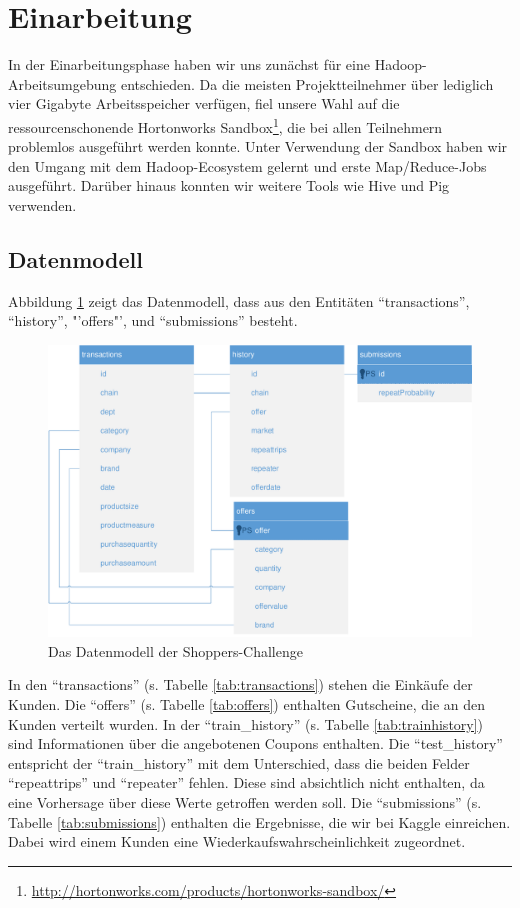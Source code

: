 \section{Einarbeitung}
In der Einarbeitungsphase haben wir uns zunächst für eine Hadoop-Arbeitsumgebung entschieden. Da die meisten Projektteilnehmer über lediglich vier Gigabyte Arbeitsspeicher verfügen, fiel unsere Wahl auf die ressourcenschonende Hortonworks Sandbox\footnote{\url{http://hortonworks.com/products/hortonworks-sandbox/}}, die bei allen Teilnehmern problemlos ausgeführt werden konnte. Unter Verwendung der Sandbox haben wir den Umgang mit dem Hadoop-Ecosystem gelernt und erste Map/Reduce-Jobs ausgeführt. Darüber hinaus konnten wir weitere Tools wie Hive und Pig verwenden.

\renewcommand{\arraystretch}{1.3}

\subsection{Datenmodell}
Abbildung \ref{fig:ShoppersTables} zeigt das Datenmodell, dass aus den Entitäten "`transactions"', "`history"', "'offers"', und "`submissions"' besteht. 

\begin{figure}[H]
\centering
\includegraphics[width=0.93\linewidth]{Bilder/ShoppersTables}
\caption{Das Datenmodell der Shoppers-Challenge}
\label{fig:ShoppersTables}
\end{figure}

In den "`transactions"' (s. Tabelle \ref{tab:transactions}) stehen die Einkäufe der Kunden.
Die "`offers"' (s. Tabelle \ref{tab:offers}) enthalten Gutscheine, die an den Kunden verteilt wurden.
In der "`train\_history"' (s. Tabelle \ref{tab:trainhistory}) sind Informationen über die angebotenen Coupons enthalten.
Die "`test\_history"' entspricht der "`train\_history"' mit dem Unterschied, dass die beiden Felder "`repeattrips"' und "`repeater"' fehlen. Diese sind absichtlich nicht enthalten, da eine Vorhersage über diese Werte getroffen werden soll.
Die "`submissions"' (s. Tabelle \ref{tab:submissions}) enthalten die Ergebnisse, die wir bei Kaggle einreichen. Dabei wird einem Kunden eine Wiederkaufswahrscheinlichkeit zugeordnet.

